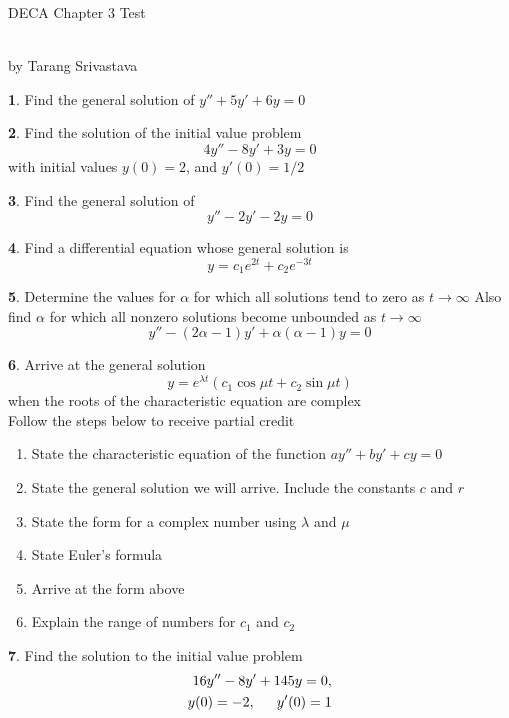 \documentclass[11pt]{article}
\author{Tarang Srivastava}
\newcommand{\makechaptertitle}[1]{
\begin{center}
	\begin{large}
		DECA Chapter #1 Test
	\end{large}
	\begin{small}
		\\by Tarang Srivastava
	\end{small}
\end{center}
}
\theoremstyle{definition}
\newtheorem{q}{}
\begin{document}
	\setlength\columnsep{.5in}
	\begin{multicols*}{2}
		\makechaptertitle{3}
		\begin{q}
			Find the general solution of $y'' + 5y' + 6y = 0$
		\end{q}
		\begin{q}
			Find the solution of the initial value problem
			\[ 4 y'' - 8y' + 3y = 0 \]
			with initial values $ y(0) = 2 $, and $ y'(0) = 1/2 $\\
		\end{q}
		\begin{q}
			Find the general solution of \[ y''-2y'-2y=0 \]
		\end{q}
		\begin{q}
			Find a differential equation whose general solution is \[ y = c_1 e^{2t}  + c_2 e^{-3t}\]
		\end{q}
		\begin{q}
				Determine the values for $ \alpha $ for which all solutions tend to zero as $ t \rightarrow\infty $ Also find $ \alpha $ for which all nonzero solutions become unbounded as $ t \rightarrow \infty $
			\[ y'' - (2 \alpha - 1)y' + \alpha(\alpha-1)y = 0 \]
		\end{q}
		\begin{q}
			Arrive at the general solution \[y = e^{\lambda t} (c_1\cos \mu t + c_2 \sin \mu t) \] when the roots of the characteristic equation are complex \\ 
			Follow the steps below to receive partial credit 
			\begin{enumerate}
				\item State the characteristic equation of the function $ ay''+ by' + cy = 0 $
				\item State the general solution we will arrive. Include the constants $ c $ and $ r $
				\item State the form for a complex number using $ \lambda $ and $ \mu $
				\item State Euler's formula 
				\item Arrive at the form above 
				\item Explain the range of numbers for $ c_1 $ and $ c_2 $
			\end{enumerate}
		\end{q}	
		\begin{q}
			Find the solution to the initial value problem 
			\begin{align*}
				16y'' - 8y' + 145y = 0, \\ \nonumber
				y(0) = -2, \indent y'(0)=1 \nonumber

\end{align*}
\end{q}
\end{multicols*}
\end{document}
